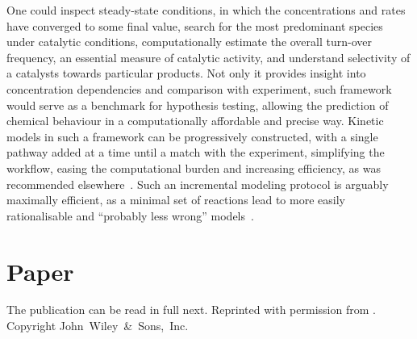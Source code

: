 One could inspect steady-state conditions, in which the concentrations and rates have converged to some final value,
search for the most predominant species under catalytic conditions, computationally estimate the overall turn-over frequency,
an essential measure of catalytic activity, and understand selectivity of a catalysts towards particular products.
Not only it provides insight into concentration dependencies and comparison with experiment,
such framework would serve as a benchmark for hypothesis testing, allowing the prediction of chemical behaviour in a computationally affordable and precise way.
Kinetic models in such a framework can be progressively constructed, with a single pathway added at a time until a match with the experiment,
simplifying the workflow, easing the computational burden and increasing efficiency, as was recommended elsewhere~\cite{Jara_z_2019}.
Such an incremental modeling protocol is arguably maximally efficient, as a
minimal set of reactions lead to more easily rationalisable and
``probably less wrong'' models~\cite{Blackmond_2015,Jara_z_2019}.

\section{Paper}

The publication can be read in full next.
Reprinted with permission from
.
Copyright
\citeyear{Schneider_2022}
John~Wiley~\&~Sons,~Inc.


